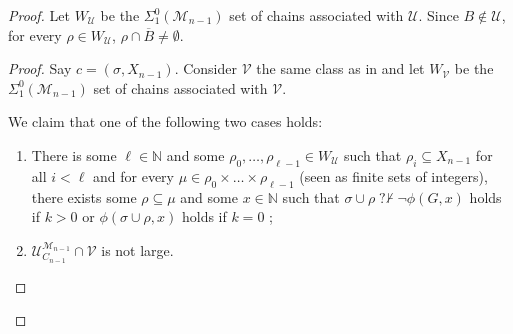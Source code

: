 \documentclass{article}
\def\NN{\mathbb{N}}
\def\PP{\mathbb{P}}
\def\U{\mathcal{U}}
\def\V{\mathcal{V}}
\def\M{\mathcal{M}}
\def\PP{\mathbb{P}}
\newcommand{\nqvdash}{\operatorname{{?}{\nvdash}}}
\numberwithin{theorem}{section}
\newtheorem{lemma}[theorem]{Lemma}
\theoremstyle{definition}
\begin{document}
\begin{proof}
Let $W_\U$ be the $\Sigma_1^0(\M_{n-1})$ set of chains associated with $\U$. Since $B \notin \U$, for every $\rho \in W_\U$, $\rho \cap \overline{B} \neq \emptyset$.


\begin{proof}
Say $c =(\sigma, X_{n-1})$.
Consider $\V$ the same class as in  and let $W_\V$ be the $\Sigma_1^0(\M_{n-1})$ set of chains associated with $\V$.



We claim that one of the following two cases holds:

\begin{enumerate}
    \item[(2.a)] There is some $\ell \in \NN$ and some $\rho_0, \dots, \rho_{\ell-1} \in W_\U$ such that $\rho_i \subseteq X_{n-1}$ for all $i < \ell$ and for every $\mu \in \rho_0 \times \dots \times \rho_{\ell-1}$ (seen as finite sets of integers), there exists some $\rho \subseteq \mu$ and some $x \in \NN$ such that $\sigma \cup \rho \nqvdash \neg \phi(G,x)$ holds if $k > 0$ or $\phi(\sigma \cup \rho,x)$ holds if $k = 0$ ;
    \item[(2.b)] $\U_{C_{n-1}}^{\M_{n-1}} \cap \V$ is not large.
\end{enumerate}


\end{proof}
\end{proof}
\end{document}
